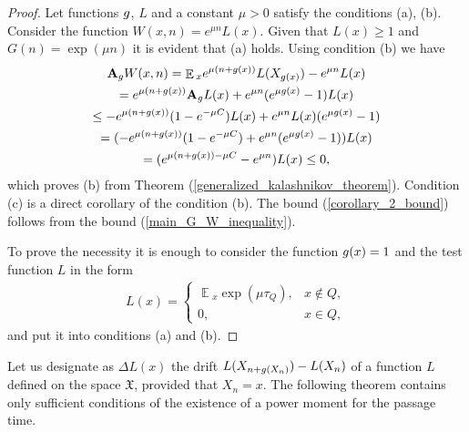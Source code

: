 \documentclass[10pt, reqno]{amsart}
\theoremstyle{definition}
\newcommand{\aasVar}{Q} %
\newcommand{\astVar}{\tau} %
\newcommand{\gtfVar}{G} %
\newcommand{\wtfVar}{W} %
\newcommand{\atoVar}{\mathbf{A}} %
\newcommand{\ltfVar}{L} %
\newcommand{\assVar}{\mathfrak{X}} %
\DeclareMathOperator*{\E}{\mathbb{E}}
\begin{document}
	\begin{proof}
		Let functions $g$, $\ltfVar$ and a constant $\mu > 0$ satisfy the conditions (a), (b). Consider the function $\wtfVar(x, n) = e^{\mu n}\ltfVar(x)$. Given that $\ltfVar(x) \geq 1$ and $\gtfVar(n) = \exp(\mu n)$ it is evident that (a) holds. Using condition (b) we have
		\begin{gather*}
		\atoVar_{\gffVar}\wtfVar(x, n) = \E{}_{x}e^{\mu(n + g(x))}\ltfVar(X_{\gffVar(x)}) - e^{\mu n}\ltfVar(x) \\ = e^{\mu(n + \gffVar(x))}\atoVar_{\gffVar}\ltfVar(x) + e^{\mu n}(e^{\mu\gffVar(x)} - 1)\ltfVar(x) \\ \leq -e^{\mu(n + \gffVar(x))}(1 - e^{-\mu C})\ltfVar(x) + e^{\mu n}\ltfVar(x)(e^{\mu\gffVar(x)} - 1) \\ = (-e^{\mu(n + \gffVar(x))}(1 - e^{-\mu C}) + e^{\mu n}(e^{\mu \gffVar(x)} - 1))\ltfVar(x) \\ = (e^{\mu(n + \gffVar(x)) - \mu C} - e^{\mu n})\ltfVar(x) \leq 0,
		\end{gather*}
		which proves (b) from Theorem (\ref{generalized_kalashnikov_theorem}). Condition (c) is a direct corollary of the condition (b). The bound (\ref{corollary_2_bound}) follows from the bound (\ref{main_G_W_inequality}).
		
		To prove the necessity it is enough to consider the function $g(x) = 1$ and the test function $\ltfVar$ in the form
		\begin{gather*}
		\ltfVar(x) = \begin{cases}
		\E{}_{x}\exp(\mu\astVar_{\aasVar}), & x \notin \aasVar,\\
		0, & x \in \aasVar,
		\end{cases}
		\end{gather*}
		and put it into conditions (a) and (b).
	\end{proof}
	
	Let us designate as $\Delta\ltfVar(x)$ the drift $\ltfVar(X_{n + \gffVar(X_{n})}) - \ltfVar(X_{n})$ of a function $\ltfVar$ defined on the space $\assVar$, provided that $X_{n} = x$. The following theorem contains only sufficient conditions of the existence of a power moment for the passage time.
	
\end{document}
